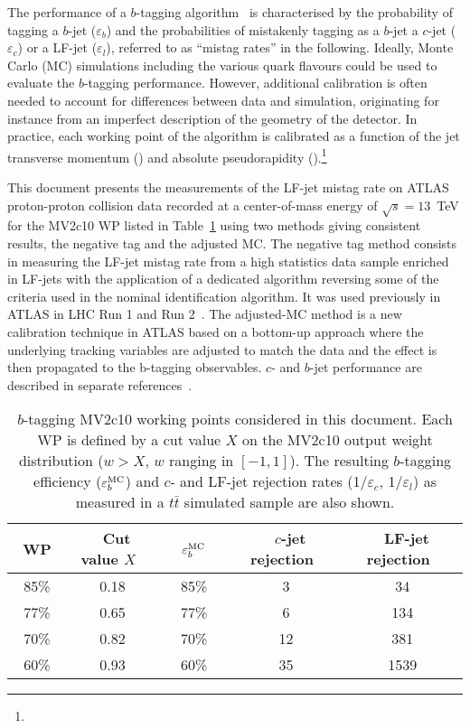 The performance of a $b$-tagging algorithm~\cite{PERF-2012-04} is characterised by the probability of tagging a $b$-jet ($\varepsilon_b$) and the probabilities of mistakenly tagging as a $b$-jet a $c$-jet ($\varepsilon_c$) or a LF-jet ($\varepsilon_l$), referred to as ``mistag rates'' in the following. Ideally, Monte Carlo (MC) simulations including the various quark flavours could be used to evaluate the $b$-tagging performance. However, additional calibration is often needed to account for differences between data and simulation, originating for instance from an imperfect description of the geometry of the detector. In practice, each working point of the algorithm is calibrated as a function of the jet transverse momentum (\ptjet) and absolute pseudorapidity (\aetajet).\footnote{\AtlasCoordFootnote}

This document presents the measurements of the LF-jet mistag rate on ATLAS proton-proton collision data recorded at a center-of-mass energy of $\sqrt{s}=13$~TeV for the MV2c10 WP listed in Table~\ref{tab:wp} using two methods giving consistent results, the negative tag and the adjusted MC. The negative tag method consists in measuring the LF-jet mistag rate from a high statistics data sample enriched in LF-jets with the application of a dedicated algorithm reversing some of the criteria used in the nominal identification algorithm. It was used previously in ATLAS in LHC Run 1 and Run 2~\cite{ATLAS-CONF-2014-046,this_work}. The adjusted-MC method is a new calibration technique in ATLAS based on a bottom-up approach where the underlying tracking variables are adjusted to match the data and the effect is then propagated to the b-tagging observables. $c$- and $b$-jet performance are described in separate references~\cite{ATLAS-CONF-2014-046,calib1,calib2,calib3}.



\begin{table}[htb]
  \setlength\extrarowheight{3pt}
  \caption{$b$-tagging MV2c10 working points considered in this document. Each WP is defined by a cut value $X$ on the MV2c10 output weight distribution ($w>X$, $w$ ranging in $[-1,1]$). The resulting $b$-tagging efficiency ($\varepsilon^{\textrm{MC}}_b$) and $c$- and LF-jet rejection rates (1/$\varepsilon_c$, 1/$\varepsilon_l$) as measured in a $t\bar{t}$ simulated sample are also shown.}
  \begin{center}
      \begin{tabular}{|c|c | c | cc|}
      \hline
      ~WP~ & ~Cut value $X$~ & ~~$\varepsilon^{\textrm{MC}}_b$~~ & ~$c$-jet rejection~ & ~LF-jet rejection~ \\[3.5pt]
      \hline
      85\% &     0.18  &     85\%   & 3   & 34 \\
      77\% &     0.65  &     77\%   & 6   & 134 \\
      70\% &     0.82  &     70\%   & 12  & 381 \\
      60\% &     0.93  &     60\%   & 35  & 1539 \\
      \hline
  \end{tabular}
  \end{center}
\label{tab:wp}
\end{table}


